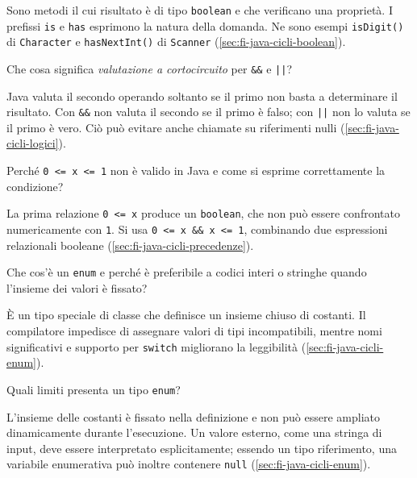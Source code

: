 Sono metodi il cui risultato è di tipo \texttt{boolean} e che
verificano una proprietà. I prefissi \texttt{is} e \texttt{has}
esprimono la natura della domanda. Ne sono esempi
\texttt{isDigit()} di \texttt{Character} e
\texttt{hasNextInt()} di \texttt{Scanner}
(\cref{sec:fi-java-cicli-boolean}).

\begin{exercise}
\label{ex:fi-esercizi-java-cicli-cortocircuito}
Che cosa significa \emph{valutazione a cortocircuito} per
\texttt{\&\&} e \texttt{||}?
\end{exercise}

Java valuta il secondo operando soltanto se il primo non basta
a determinare il risultato. Con \texttt{\&\&} non valuta il
secondo se il primo è falso; con \texttt{||} non lo valuta se
il primo è vero. Ciò può evitare anche chiamate su riferimenti
nulli (\cref{sec:fi-java-cicli-logici}).

\begin{exercise}
\label{ex:fi-esercizi-java-cicli-relazionale-errore}
Perché \texttt{0 <= x <= 1} non è valido in Java e come si
esprime correttamente la condizione?
\end{exercise}

La prima relazione \texttt{0 <= x} produce un \texttt{boolean},
che non può essere confrontato numericamente con \texttt{1}.
Si usa \texttt{0 <= x \&\& x <= 1}, combinando due
espressioni relazionali booleane
(\cref{sec:fi-java-cicli-precedenze}).

\begin{exercise}
\label{ex:fi-esercizi-java-cicli-enum}
Che cos'è un \texttt{enum} e perché è preferibile a codici
interi o stringhe quando l'insieme dei valori è fissato?
\end{exercise}

È un tipo speciale di classe che definisce un insieme chiuso di
costanti. Il compilatore impedisce di assegnare valori di tipi
incompatibili, mentre nomi significativi e supporto per
\texttt{switch} migliorano la leggibilità
(\cref{sec:fi-java-cicli-enum}).

\begin{exercise}
\label{ex:fi-esercizi-java-cicli-enum-limiti}
Quali limiti presenta un tipo \texttt{enum}?
\end{exercise}

L'insieme delle costanti è fissato nella definizione e non può
essere ampliato dinamicamente durante l'esecuzione. Un valore
esterno, come una stringa di input, deve essere interpretato
esplicitamente; essendo un tipo riferimento, una variabile
enumerativa può inoltre contenere \texttt{null}
(\cref{sec:fi-java-cicli-enum}).

